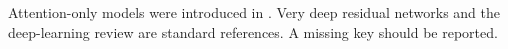 \documentclass{article}
\begin{document}
Attention-only models were introduced in \cite{vaswani2017attention}.
Very deep residual networks \citep{he2016deep} and the deep-learning review \cite{lecun2015deep} are standard references.
A missing key \cite{nokey2020} should be reported.


\end{document}
